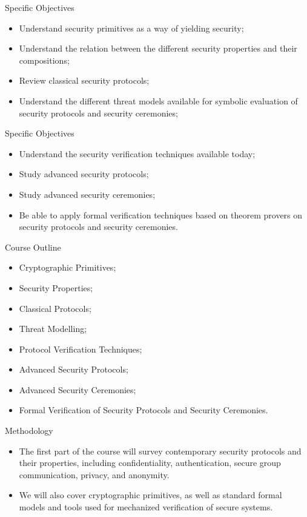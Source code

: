 \documentclass[12pt]{beamer}
\begin{document}
\begin{frame}{Specific Objectives}
\begin{itemize}
\item Understand security primitives as a way of yielding security;\pause
\item Understand the relation between the different security properties and their
compositions;\pause
\item Review classical security protocols;\pause
\item Understand the different threat models available for symbolic evaluation of security protocols and security ceremonies;
\end{itemize}
\end{frame}

\begin{frame}{Specific Objectives}
\begin{itemize}
\item Understand the security verification techniques available today;\pause
\item Study advanced security protocols;\pause
\item Study advanced security ceremonies;\pause
\item Be able to apply formal verification techniques based on theorem provers on security protocols and security ceremonies.
\end{itemize}
\end{frame}


\begin{frame}{Course Outline}
\begin{itemize}
\item Cryptographic Primitives;\pause
\item Security Properties;\pause
\item Classical Protocols;\pause
\item Threat Modelling;\pause
\item Protocol Verification Techniques;\pause
\item Advanced Security Protocols;\pause
\item Advanced Security Ceremonies;\pause
\item Formal Verification of Security Protocols and Security Ceremonies.
\end{itemize}
\end{frame}


\begin{frame}{Methodology}
\begin{itemize}
\item The first part of the course will survey contemporary security protocols and their properties, including confidentiality, authentication, secure group communication, privacy, and anonymity. \pause
\item We will also cover cryptographic primitives, as well as standard formal models and tools used for mechanized verification of secure systems.
\end{itemize}
\end{frame}
\end{document}

